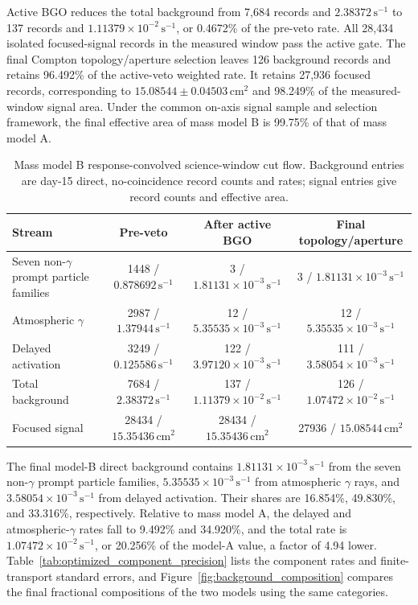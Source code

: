 \documentclass[11pt]{article}
\newcommand{\revblue}[1]{\textcolor{revisionblue}{#1}}
\newcommand{\cps}{\ensuremath{\,\mathrm{s^{-1}}}}
\begin{document}
Active BGO reduces the total background from 7,684 records and $2.38372\cps$ to 137 records and $1.11379\times10^{-2}\cps$, or 0.4672\% of the pre-veto rate. All 28,434 isolated focused-signal records in the measured window pass the active gate. The final Compton topology/aperture selection leaves 126 background records and retains 96.492\% of the active-veto weighted rate. It retains 27,936 focused records, corresponding to $15.08544\pm0.04503\,\mathrm{cm^2}$ and 98.249\% of the measured-window signal area. \revblue{Under the common on-axis signal sample and selection framework, the final effective area of mass model B is 99.75\% of that of mass model A.}

\begin{table}[H]
\centering
\caption{Mass model B response-convolved science-window cut flow. Background entries are day-15 direct, no-coincidence record counts and rates; signal entries give record counts and effective area.}
\label{tab:optimized_cutflow}
\footnotesize
\begin{tabular}{lccc}
\toprule
Stream & Pre-veto & After active BGO & Final topology/aperture \\
\midrule
\revblue{Seven non-$\gamma$ prompt particle families} & 1448 / $0.878692\cps$ & 3 / $1.81131\times10^{-3}\cps$ & 3 / $1.81131\times10^{-3}\cps$ \\
\revblue{Atmospheric $\gamma$} & 2987 / $1.37944\cps$ & 12 / $5.35535\times10^{-3}\cps$ & 12 / $5.35535\times10^{-3}\cps$ \\
Delayed activation & 3249 / $0.125586\cps$ & 122 / $3.97120\times10^{-3}\cps$ & 111 / $3.58054\times10^{-3}\cps$ \\
Total background & 7684 / $2.38372\cps$ & 137 / $1.11379\times10^{-2}\cps$ & 126 / $1.07472\times10^{-2}\cps$ \\
Focused signal & 28434 / $15.35436\,\mathrm{cm^2}$ & 28434 / $15.35436\,\mathrm{cm^2}$ & 27936 / $15.08544\,\mathrm{cm^2}$ \\
\bottomrule
\end{tabular}
\end{table}

The final model-B direct background contains $1.81131\times10^{-3}\cps$ from
the \revblue{seven non-$\gamma$ prompt particle families}, $5.35535\times10^{-3}\cps$ from \revblue{atmospheric
$\gamma$ rays}, and $3.58054\times10^{-3}\cps$ from delayed
activation. Their shares are 16.854\%, 49.830\%, and 33.316\%, respectively.
Relative to mass model A, the delayed and \revblue{atmospheric-$\gamma$ rates} fall to
9.492\% and 34.920\%, and the total rate is $1.07472\times10^{-2}\cps$, or
20.256\% of the model-A value, a factor of 4.94 lower. \revblue{Table~\ref{tab:optimized_component_precision}
lists the component rates and finite-transport standard errors, and
Figure~\ref{fig:background_composition} compares the final fractional
compositions of the two models using the same categories.}
\end{document}
